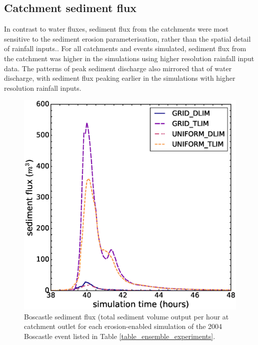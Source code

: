 \subsection{Catchment sediment flux}
In contrast to water fluxes, sediment flux from the catchments were most sensitive to the sediment erosion parameterisation, rather than the spatial detail of rainfall inputs.. For all catchments and events simulated, sediment flux from the catchment was higher in the simulations using higher resolution rainfall input data. The patterns of peak sediment discharge also mirrored that of water discharge, with sediment flux peaking earlier in the simulations with higher resolution rainfall inputs. 

\begin{figure}[t]
\includegraphics[width=14cm]{chp06_figures_scripts/figure_boscastle_sedigraph_ensemble.eps}
\caption{Boscastle sediment flux (total sediment volume output per hour at catchment outlet for each erosion-enabled simulation of the 2004 Boscastle event listed in Table \ref{table_ensemble_experiments}.}
\label{fig_boscastle_sedigraph_ensemble}
\end{figure}

